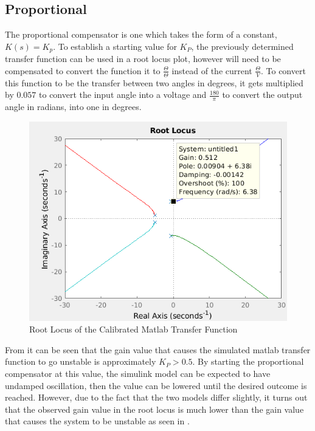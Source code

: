 \documentclass[a4paper, 11pt, compsoc]{IEEEtran}
\begin{document}
		\subsection{Proportional}\label{sec:p}
			The proportional compensator is one which takes the form of a constant, $K(s) = K_p$. To establish a starting value for $K_P$, the previously determined transfer function can be used in a root locus plot, however will need to be compensated to convert the function it to $\frac{\Theta}{\Theta}$ instead of the current $\frac{\Theta}{V}$. To convert this function to be the transfer between two angles in degrees, it gets multiplied by $0.057$ to convert the input angle into a voltage and $\frac{180}{\pi}$ to convert the output angle in radians, into one in degrees.
			\begin{figure}[!ht]
				\centering
				\includegraphics[width=\columnwidth]{lab5RLocus.png}
				\caption{Root Locus of the Calibrated Matlab Transfer Function}
				\label{fig:lab5RLocus}
			\end{figure}
			\par
			From  it can be seen that the gain value that causes the simulated matlab transfer function to go unstable is approximately $K_P > 0.5$. By starting the proportional compensator at this value, the simulink model can be expected to have undamped oscillation, then the value can be lowered until the desired outcome is reached. However, due to the fact that the two models differ slightly, it turns out that the observed gain value in the root locus is much lower than the gain value that causes the system to be unstable as seen in .
\end{document}
